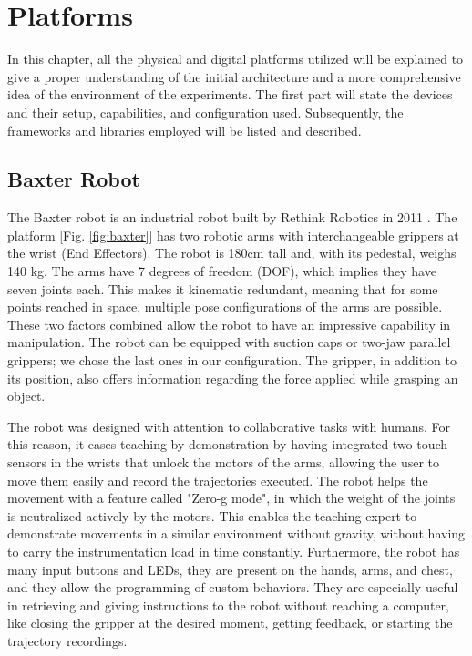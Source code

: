 \chapter{Platforms}
\label{chap:platforms}
In this chapter, all the physical and digital platforms utilized will be explained to give a proper understanding of the initial architecture and a more comprehensive idea of the environment of the experiments. The first part will state the devices and their setup, capabilities, and configuration used. Subsequently, the frameworks and libraries employed will be listed and described. 

\section{Baxter Robot}
The Baxter robot is an industrial robot built by Rethink Robotics in 2011 \cite{wiki:baxter}. The platform [Fig. \ref{fig:baxter}] has two robotic arms with interchangeable grippers at the wrist (End Effectors). The robot is 180cm tall and, with its pedestal, weighs 140 kg. The arms have 7 degrees of freedom (DOF), which implies they have seven joints each. This makes it kinematic redundant, meaning that for some points reached in space, multiple pose configurations of the arms are possible. These two factors combined allow the robot to have an impressive capability in manipulation. The robot can be equipped with suction caps or two-jaw parallel grippers; we chose the last ones in our configuration. The gripper, in addition to its position, also offers information regarding the force applied while grasping an object.

The robot was designed with attention to collaborative tasks with humans. For this reason, it eases teaching by demonstration by having integrated two touch sensors in the wrists that unlock the motors of the arms, allowing the user to move them easily and record the trajectories executed. The robot helps the movement with a feature called "Zero-g mode", in which the weight of the joints is neutralized actively by the motors. This enables the teaching expert to demonstrate movements in a similar environment without gravity, without having to carry the instrumentation load in time constantly. Furthermore, the robot has many input buttons and LEDs, they are present on the hands, arms, and chest, and they allow the programming of custom behaviors. They are especially useful in retrieving and giving instructions to the robot without reaching a computer, like closing the gripper at the desired moment, getting feedback, or starting the trajectory recordings. 

